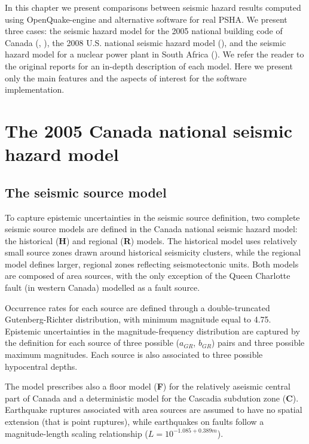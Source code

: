 In this chapter we present comparisons between seismic hazard results computed
using OpenQuake-engine and alternative software for real PSHA. We present three
cases: the seismic hazard model for the 2005 national building code of Canada
(\cite{adams2003}, \cite{halchuk2008}), the 2008 U.S. national seismic hazard
model (\cite{petersen2008}), and the seismic hazard model for a nuclear power
plant in South Africa (\cite{bommer2013}). We refer the reader to the original
reports for an in-depth description of each model. Here we present only the
main features and the aspects of interest for the software implementation.
%
\section{The 2005 Canada national seismic hazard model}
%
\subsection{The seismic source model}
To capture epistemic uncertainties in the seismic source definition, two
complete seismic source models are defined in the Canada national seismic hazard
model: the historical (\textbf{H}) and regional (\textbf{R}) models. The
historical model uses relatively small source zones drawn around historical
seismicity clusters, while the regional model defines larger, regional zones
reflecting seismotectonic units. Both models are composed of area sources, with
the only exception of the Queen Charlotte fault (in western Canada) modelled as
a fault source. 

Occurrence rates for each source are defined through a double-truncated
Gutenberg-Richter distribution, with minimum magnitude equal to 4.75. Epistemic
uncertainties in the magnitude-frequency distribution are captured by the
definition for each source of three possible ($a_{GR}$, $b_{GR}$) pairs and
three possible maximum magnitudes. Each source is also associated to three
possible hypocentral depths.

The model prescribes also a floor model (\textbf{F}) for the relatively aseismic
central part of Canada and a deterministic model for the Cascadia subdution zone
(\textbf{C}). Earthquake ruptures associated with area sources are assumed to
have no spatial extension (that is point ruptures), while earthquakes on faults
follow a magnitude-length scaling relationship ($L=10^{-1.085 + 0.389 m}$).
%
